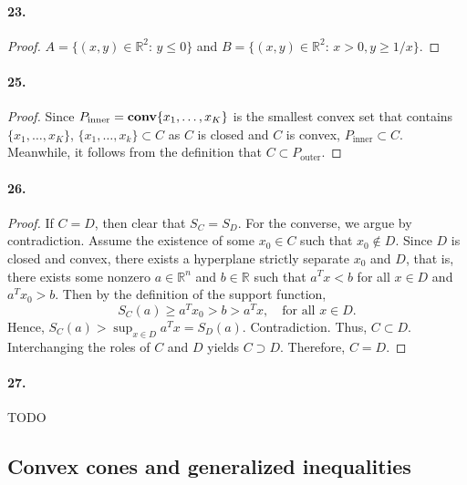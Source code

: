   \paragraph{23.}
  \begin{proof}
    $A=\{(x,y)\in\mathbb{R}^2:\,y\le 0\}$ and $B=\{(x,y)\in\mathbb{R}^2:\,x>0,
    y\ge 1/x\}$.
  \end{proof}
  
  \paragraph{25.}
  \begin{proof}
    Since $P_{\text{inner}}=\operatorname{\mathbf{conv}}\{x_1,\dots,x_K\}$ is the smallest convex set
    that contains $\{x_1,\dots,x_K\}$, $\{x_1,\dots,x_k\}\subset C$ as $C$ is
    closed and $C$ is convex, $P_{\text{inner}}\subset C$. Meanwhile, it follows
    from the definition that $C\subset P_{\text{outer}}$.
  \end{proof}
  
  \paragraph{26.}
  \begin{proof}
    If $C=D$, then clear that $S_C=S_D$. For the converse, we argue by 
    contradiction. Assume the existence of some $x_0\in C$ such that $x_0\notin 
    D$. Since $D$ is closed and convex, there exists a hyperplane strictly 
    separate $x_0$ and $D$, that is, there exists some nonzero $a\in\mathbb{R}
    ^n$ and $b\in\mathbb{R}$ such that $a^Tx<b$ for all $x\in D$ and $a^Tx_0>b$.
    Then by the definition of the support function, 
    \[
      S_C(a)\ge a^Tx_0 > b > a^Tx,\quad\text{for all $x\in D.$}
    \]
    Hence, $S_C(a)>\sup_{x\in D}a^Tx=S_D(a)$. Contradiction. Thus, $C\subset D$.
    Interchanging the roles of $C$ and $D$ yields $C\supset D$. Therefore, 
    $C=D$.
  \end{proof}
  
  \paragraph{27.} TODO
\subsection{Convex cones and generalized inequalities}
